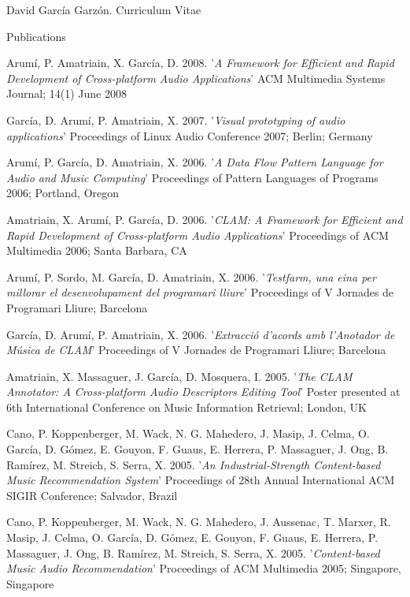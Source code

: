 \documentclass{article}
\begin{document}
\begin{cv}{David García Garzón. Curriculum Vitae}
\begin{cvlist}{Publications}
\item[] {\sc Arumí, P. Amatriain, X. García, D.} 2008.
'{\em A Framework for Efficient and Rapid Development of Cross-platform Audio Applications}'
ACM Multimedia Systems Journal; 14(1) June 2008

\item[] {\sc García, D. Arumí, P. Amatriain, X.} 2007.
'{\em Visual prototyping of audio applications}'
Proceedings of Linux Audio Conference 2007; Berlin; Germany

\item[] {\sc Arumí, P. García, D. Amatriain, X.} 2006.
'{\em A Data Flow Pattern Language for Audio and Music Computing}'
Proceedings of Pattern Languages of Programs 2006; Portland, Oregon

\item[] {\sc Amatriain, X. Arumí, P. García, D.} 2006.
'{\em CLAM: A Framework for Efficient and Rapid Development of Cross-platform Audio Applications}'
Proceedings of ACM Multimedia 2006; Santa Barbara, CA

\item[] {\sc Arumí, P. Sordo, M. García, D. Amatriain, X.} 2006.
'{\em Testfarm, una eina per millorar el desenvolupament del programari lliure}'
Proceedings of V Jornades de Programari Lliure; Barcelona

\item[] {\sc García, D. Arumí, P. Amatriain, X.} 2006.
'{\em Extracció d'acords amb l'Anotador de Música de CLAM}'
Proceedings of V Jornades de Programari Lliure; Barcelona

\item[] {\sc Amatriain, X. Massaguer, J. García, D. Mosquera, I.} 2005.
'{\em The CLAM Annotator: A Cross-platform Audio Descriptors Editing Tool}'
Poster presented at 6th International Conference on Music Information Retrieval; London, UK

\item[] {\sc Cano, P. Koppenberger, M. Wack, N. G. Mahedero, J. Masip, J. Celma, O. García, D. Gómez, E. Gouyon, F. Guaus, E. Herrera, P. Massaguer, J. Ong, B. Ramírez, M. Streich, S. Serra, X.} 2005.
'{\em An Industrial-Strength Content-based Music Recommendation System}'
Proceedings of 28th Annual International ACM SIGIR Conference; Salvador, Brazil

\item[] {\sc Cano, P. Koppenberger, M. Wack, N. G. Mahedero, J. Aussenac, T. Marxer, R. Masip, J. Celma, O. García, D. Gómez, E. Gouyon, F. Guaus, E. Herrera, P. Massaguer, J. Ong, B. Ramírez, M. Streich, S. Serra, X.} 2005.
'{\em Content-based Music Audio Recommendation}'
Proceedings of ACM Multimedia 2005; Singapore, Singapore


\end{cvlist}
\end{cv}
\end{document}
